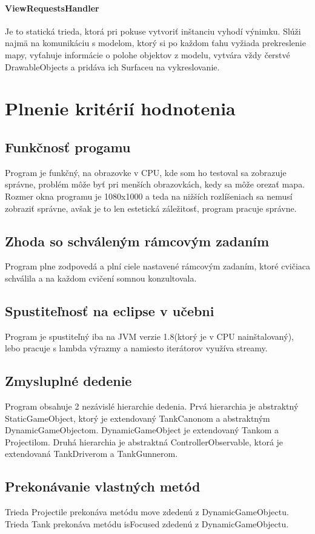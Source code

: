 \documentclass[12pt,oneside,slovak,a4paper]{article}
\begin{document}
\paragraph{ViewRequestsHandler} Je to statická trieda, ktorá pri pokuse vytvoriť inštanciu vyhodí výnimku. Slúži najmä na komunikáciu s modelom, ktorý si po každom ťahu vyžiada prekreslenie mapy, vyťahuje informácie o polohe objektov z modelu, vytvára vždy čerstvé DrawableObjects a pridáva ich Surfaceu na vykreslovanie.

\section{Plnenie kritérií hodnotenia}
\subsection{Funkčnosť progamu}
Program je funkčný, na obrazovke v CPU, kde som ho testoval sa zobrazuje správne, problém môže byť pri menších obrazovkách, kedy sa môže orezať mapa. Rozmer okna programu je 1080x1000 a teda na nižších rozlíšeniach sa nemusí zobraziť správne, avšak je to len estetická záležitosť, program pracuje správne.
\subsection{Zhoda so schváleným rámcovým zadaním}
Program plne zodpovedá a plní ciele nastavené rámcovým zadaním, ktoré cvičiaca schválila a na každom cvičení somnou konzultovala.
\subsection{Spustiteľnosť na eclipse v učebni}
Program je spustiteľný iba na JVM verzie 1.8(ktorý je v CPU nainštalovaný), lebo pracuje s lambda výrazmy a namiesto iterátorov využíva streamy.
\subsection{Zmysluplné dedenie}
Program obsahuje 2 nezávislé hierarchie dedenia. Prvá hierarchia je abstraktný StaticGameObject, ktorý je extendovaný TankCanonom a abstraktným DynamicGameObjectom. DynamicGameObject je extendovaný Tankom a Projectilom. Druhá hierarchia je abstraktná ControllerObservable, ktorá je extendovaná TankDriverom a TankGunnerom.
\subsection{Prekonávanie vlastných metód}
Trieda Projectile prekonáva metódu move zdedenú z DynamicGameObjectu. Trieda Tank prekonáva metódu isFocused zdedenú z DynamicGameObjectu.
\end{document}
